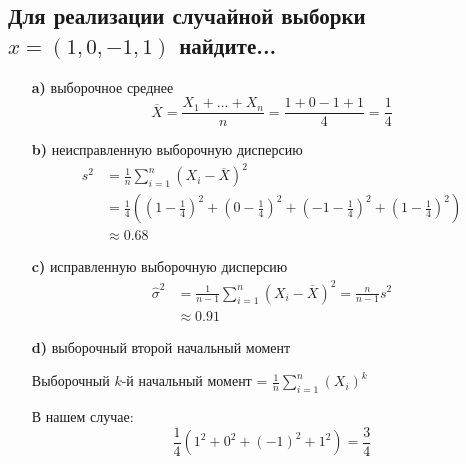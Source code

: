 \documentclass{article}
\begin{document}
\subsection{Для реализации случайной выборки $x = (1, 0,-1, 1)$ найдите...}
\begin{itemize}
    \item[\textbf{a)}] выборочное среднее
    \begin{equation*}
        \overline{X}=\displaystyle\frac{X_1+\ldots+X_n}{n}=\frac{1+0-1+1}{4}=\frac{1}{4}
    \end{equation*}

    \item[\textbf{b)}] неисправленную выборочную дисперсию
    \begin{equation*}
        \begin{aligned}
            s^2&=\frac{1}{n}\sum_{i=1}^n\left(X_i-\overline{X}\right)^2\\
            &=\frac{1}{4}\left(\left(1-\frac{1}{4}\right)^2+\left(0-\frac{1}{4}\right)^2+\left(-1-\frac{1}{4}\right)^2+\left(1-\frac{1}{4}\right)^2\right)\\
            &\approx0.68
        \end{aligned}
    \end{equation*}

    \item[\textbf{c)}] исправленную выборочную дисперсию
    \begin{equation*}
        \begin{aligned}
            \widehat{\sigma}^2&=\frac{1}{n-1}\sum_{i=1}^n\left(X_i-\overline{X}\right)^2=\frac{n}{n-1}s^2\\
            &\approx0.91
        \end{aligned}
    \end{equation*} 

    \item[\textbf{d)}] выборочный второй начальный момент
    
    Выборочный $k$-й начальный момент = $\displaystyle\frac{1}{n}\sum_{i=1}^n\left(X_i\right)^k$

    В нашем случае:
    \begin{equation*}
        \frac{1}{4}\left(1^2+0^2+(-1)^2+1^2\right)=\frac{3}{4}
    \end{equation*}
    

\end{itemize}
\end{document}

